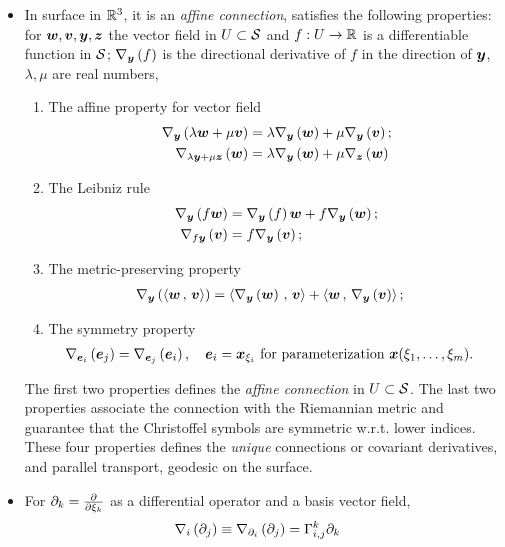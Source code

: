 \documentclass[11pt]{article}
\begin{document}
\begin{itemize}
 \item In surface in ${\mathbb R}^{3}$, it is an \emph{affine connection}, satisfies the following properties: for $\boldsymbol{w}, \boldsymbol{v}, \boldsymbol{y}, \boldsymbol{z}$ the vector field in $U\subset {\mathcal S}$ and $f: U \rightarrow {\mathbb R}$ is a differentiable function in ${\mathcal S}$; $\nabla_{\boldsymbol{y}}\left(f\right)$ is the directional derivative of $f$ in the direction of $\boldsymbol{y}$, $\lambda, \mu$ are real numbers, 
\begin{enumerate}
\item The affine property for vector field 
 \begin{align*}
\nabla_{\boldsymbol{y}}\left(\lambda\boldsymbol{w}+ \mu\boldsymbol{v}\right) &= \lambda\nabla_{\boldsymbol{y}}\left(\boldsymbol{w}\right)+ \mu\nabla_{\boldsymbol{y}}\left(\boldsymbol{v}\right); \\
\nabla_{\lambda\boldsymbol{y}+ \mu\boldsymbol{z}}\left(\boldsymbol{w}\right) &= \lambda\nabla_{\boldsymbol{y}}\left(\boldsymbol{w}\right)+ \mu\nabla_{\boldsymbol{z}}\left(\boldsymbol{w}\right)
\end{align*}
\item The Leibniz rule
 \begin{align*}
\nabla_{\boldsymbol{y}}\left(f\boldsymbol{w}\right) &= \nabla_{\boldsymbol{y}}\left(f\right)\boldsymbol{w}+ f\nabla_{\boldsymbol{y}}\left(\boldsymbol{w}\right);\\
 \nabla_{f\boldsymbol{y}}\left(\boldsymbol{v}\right) &=  f\nabla_{\boldsymbol{y}}\left(\boldsymbol{v}\right);
\end{align*}
\item The metric-preserving property
\begin{align*}
\nabla_{\boldsymbol{y}}\left(\left\langle \boldsymbol{w}\,,\, \boldsymbol{v} \right\rangle\right) &= \left\langle \nabla_{\boldsymbol{y}}\left(\boldsymbol{w}\right)\,,\, \boldsymbol{v} \right\rangle + \left\langle \boldsymbol{w}\,,\, \nabla_{\boldsymbol{y}}\left(\boldsymbol{v}\right) \right\rangle;
\end{align*}
\item The symmetry property
\begin{align*}
\nabla_{\boldsymbol{e}_{i}}\left(\boldsymbol{e}_{j}\right) &= \nabla_{\boldsymbol{e}_{j}}\left(\boldsymbol{e}_{i}\right), \quad \boldsymbol{e}_{i} = \boldsymbol{x}_{\xi_{i}}\text{ for parameterization }\boldsymbol{x}(\xi_{1},\ldots, \xi_{m}).
\end{align*}
\end{enumerate}
The first two properties defines the \emph{affine connection} in $U\subset {\mathcal S}$. The last two properties associate the connection with the Riemannian metric and guarantee that the Christoffel symbols are symmetric w.r.t. lower indices.  These four properties defines the \emph{unique} connections or covariant derivatives, and parallel transport, geodesic on the surface. \\

\item For $\partial_{k} = \frac{\partial }{ \partial \xi_{k}}$ as a differential operator and a basis vector field,
\begin{align*}
\nabla_{i}\left(\partial_{j}\right) \equiv \nabla_{\partial_{i}}\left(\partial_{j}\right) &= \Gamma_{i,j}^{k}\partial_{k}
\end{align*} 


\end{itemize}
\end{document}
